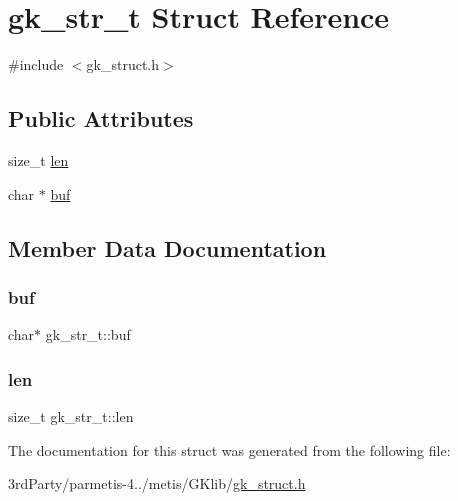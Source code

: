\hypertarget{structgk__str__t}{}\section{gk\+\_\+str\+\_\+t Struct Reference}
\label{structgk__str__t}


{\ttfamily \#include $<$gk\+\_\+struct.\+h$>$}

\subsection*{Public Attributes}
\begin{DoxyCompactItemize}
\item 
size\+\_\+t \hyperlink{structgk__str__t_acce3955b5ce3c8b9965e7163aad9705d}{len}
\item 
char $\ast$ \hyperlink{structgk__str__t_a865fb5b4ddc39efeb3c86e2251f13380}{buf}
\end{DoxyCompactItemize}


\subsection{Member Data Documentation}
\mbox{\label{structgk__str__t_a865fb5b4ddc39efeb3c86e2251f13380}} 
\subsubsection{\texorpdfstring{buf}{buf}}
{\footnotesize\ttfamily char$\ast$ gk\+\_\+str\+\_\+t\+::buf}

\mbox{\label{structgk__str__t_acce3955b5ce3c8b9965e7163aad9705d}} 
\subsubsection{\texorpdfstring{len}{len}}
{\footnotesize\ttfamily size\+\_\+t gk\+\_\+str\+\_\+t\+::len}



The documentation for this struct was generated from the following file\+:\begin{DoxyCompactItemize}
\item 
3rd\+Party/parmetis-\/4../metis/\+G\+Klib/\hyperlink{gk__struct_8h}{gk\+\_\+struct.\+h}\end{DoxyCompactItemize}
